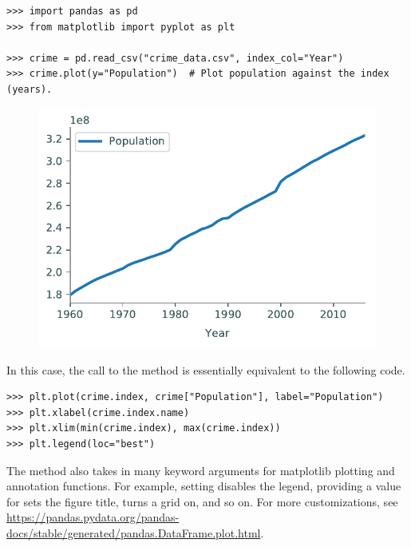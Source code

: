 
\begin{lstlisting}
>>> import pandas as pd
>>> from matplotlib import pyplot as plt

>>> crime = pd.read_csv("crime_data.csv", index_col="Year")
>>> crime.plot(y="Population")  # Plot population against the index (years).
\end{lstlisting}

\begin{figure}[H]
\centering
\includegraphics[width=.7\textwidth]{figures/population.pdf}
\end{figure}

In this case, the call to the  method is essentially equivalent to the following code.

\begin{lstlisting}
>>> plt.plot(crime.index, crime["Population"], label="Population")
>>> plt.xlabel(crime.index.name)
>>> plt.xlim(min(crime.index), max(crime.index))
>>> plt.legend(loc="best")
\end{lstlisting}

The  method also takes in many keyword arguments for matplotlib plotting and annotation functions.
For example, setting  disables the legend, providing a value for  sets the figure title,  turns a grid on, and so on.
For more customizations, see \url{https://pandas.pydata.org/pandas-docs/stable/generated/pandas.DataFrame.plot.html}.

